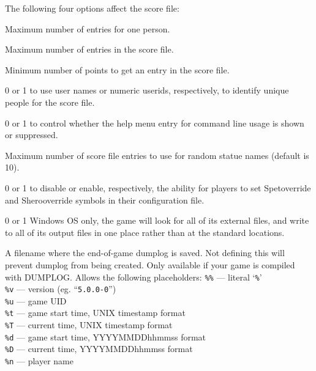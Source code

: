 \documentclass[titlepage]{article}
\begin{document}
The following four options affect the score file:
\begin{description}[font=\mdseries\itshape]
\item[PERSMAX]
Maximum number of entries for one person.
\item[ENTRYMAX]
Maximum number of entries in the score file.
\item[POINTSMIN]
Minimum number of points to get an entry in the score file.
\item[PERS\textunderscore IS\textunderscore UID]
0 or 1 to use user names or numeric userids, respectively, to identify
unique people for the score file.
\item[HIDEUSAGE]
0 or 1 to control whether the help menu entry for command
line usage is shown or suppressed.
\item[MAX\textunderscore STATUENAME\textunderscore RANK]
Maximum number of score file entries to use for
random statue names (default is 10).
\item[ACCESSIBILITY]
0 or 1 to disable or enable, respectively, the ability for players
to set S\textunderscore pet\textunderscore override and S\textunderscore hero\textunderscore override
symbols in their configuration file.
\item[PORTABLE\textunderscore DEVICE\textunderscore PATHS]
0 or 1 Windows OS only, the game will look for all of its external
files, and write to all of its output files in one place
rather than at the standard locations.
\item[DUMPLOGFILE]
A filename where the end-of-game dumplog is saved.
Not defining this will prevent dumplog from being created.
Only available if your game is compiled with DUMPLOG.
Allows the following placeholders:
\texttt{\%\%}  --- literal `\texttt{\%}'\\
\texttt{\%v}  --- version (eg. ``\texttt{5.0.0-0}'')\\
\texttt{\%u}  --- game UID\\
\texttt{\%t}  --- game start time, UNIX timestamp format\\
\texttt{\%T}  --- current time, UNIX timestamp format\\
\texttt{\%d}  --- game start time, YYYYMMDDhhmmss format\\
\texttt{\%D}  --- current time, YYYYMMDDhhmmss format\\
\texttt{\%n}  --- player name\\

\end{description}
\end{document}
